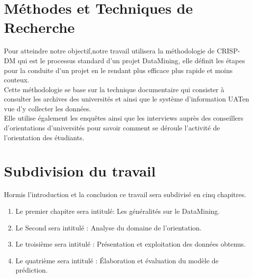 \section{Méthodes et Techniques de Recherche}
Pour atteindre notre objectif,notre  travail utilisera la méthodologie de \ac{CRISP-DM} qui est le processus standard d’un projet DataMining, elle définit les étapes pour la conduite d’un projet en le rendant plus efficace plus rapide et moins couteux. \cite{DMProces}  \\
Cette méthodologie se base sur la technique documentaire qui consister à consulter les archives des universités et ainsi que le système d'information \ac{UAT}en vue d'y collecter les données. \\
Elle utilise également les enquêtes ainsi que les interviews auprès des conseillers d'orientations d'universités pour savoir comment se déroule l'activité de l'orientation des étudiants.
\section{Subdivision du travail}
Hormis l'introduction et la conclusion ce travail sera subdivisé en cinq chapitres.  
\begin{enumerate}
	\item Le premier chapitre sera intitulé: Les généralités sur le DataMining.
	\item Le Second sera intitulé : Analyse du domaine de l'orientation.
	\item Le troisième sera intitulé : Présentation et exploitation des données obtenus. 
	\item Le quatrième sera intitulé : Élaboration  et évaluation du modèle de prédiction.
\end{enumerate}
